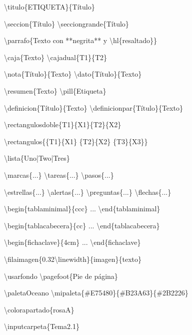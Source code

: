 \documentclass[11pt,a4paper]{extarticle}
\newcommand{\codigo}[1]{%
  \begingroup
    \setlength{\fboxsep}{5pt}%
    \colorbox{gray!10}{%
      \begin{minipage}{\dimexpr\linewidth-2\fboxsep\relax}
        \ttfamily\small #1
      \end{minipage}}%
  \endgroup
  \par\vspace{3mm}%
}
\begin{document}
\pagestyle{empty}
\paletaOceano
{}

\codigo{\textbackslash titulo\{ETIQUETA\}\{Título\}}
\codigo{\textbackslash seccion\{Título\} \textbackslash secciongrande\{Título\}}
\codigo{\textbackslash parrafo\{Texto con **negrita** y \textbackslash hl\{resaltado\}\}}
\codigo{\textbackslash caja\{Texto\} \textbackslash cajadual\{T1\}\{T2\}}
\codigo{\textbackslash nota\{Título\}\{Texto\} \textbackslash dato\{Título\}\{Texto\}}
\codigo{\textbackslash resumen\{Texto\} \textbackslash pill\{Etiqueta\}}
\codigo{\textbackslash definicion\{Título\}\{Texto\} \textbackslash definicionpar\{Título\}\{Texto\}}
\codigo{\textbackslash rectangulosdoble\{T1\}\{X1\}\{T2\}\{X2\}}
\codigo{\textbackslash rectangulos\{\{T1\}\{X1\} \{T2\}\{X2\} \{T3\}\{X3\}\}}
\codigo{\textbackslash lista\{Uno|Two|Tres\}}
\codigo{\textbackslash marcas\{...\} \textbackslash tareas\{...\} \textbackslash pasos\{...\}}
\codigo{\textbackslash estrellas\{...\} \textbackslash alertas\{...\} \textbackslash preguntas\{...\} \textbackslash flechas\{...\}}
\codigo{\textbackslash begin\{tablaminimal\}\{ccc\} ... \textbackslash end\{tablaminimal\}}
\codigo{\textbackslash begin\{tablacabecera\}\{cc\} ... \textbackslash end\{tablacabecera\}}
\codigo{\textbackslash begin\{fichaclave\}\{4cm\} ... \textbackslash end\{fichaclave\}}
\codigo{\textbackslash filaimagen\{0.32\textbackslash linewidth\}\{imagen\}\{texto\}}
\codigo{\textbackslash usarfondo \textbackslash pagefoot\{Pie de página\}}
\codigo{\textbackslash paletaOceano \textbackslash mipaleta\{\#E75480\}\{\#B23A63\}\{\#2B2226\}}
\codigo{\textbackslash colorapartado\{rosaA\}}
\codigo{\textbackslash inputcarpeta\{Tema2.1\}}
\end{document}
